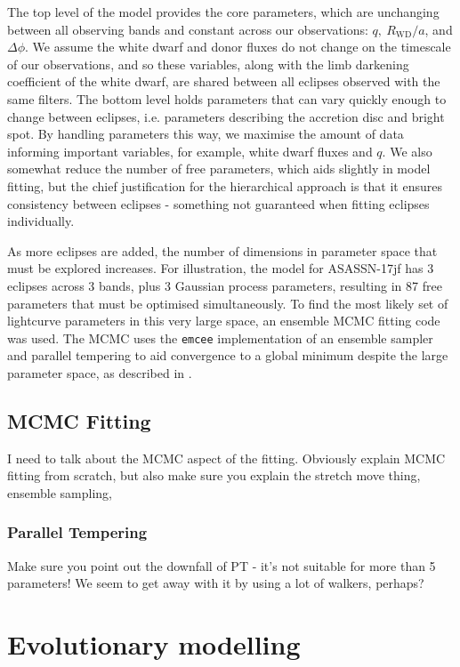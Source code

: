 The top level of the model provides the core parameters, which are unchanging between all observing bands and constant across our observations: $q,\ R_\mathrm{WD}/a$, and $\Delta\phi$. We assume the white dwarf and donor fluxes do not change on the timescale of our observations, and so these variables, along with the limb darkening coefficient of the white dwarf, are shared between all eclipses observed with the same filters. The bottom level holds parameters that can vary quickly enough to change between eclipses, i.e. parameters describing the accretion disc and bright spot. By handling parameters this way, we maximise the amount of data informing important variables, for example, white dwarf fluxes and $q$. We also somewhat reduce the number of free parameters, which aids slightly in model fitting, but the chief justification for the hierarchical approach is that it ensures consistency between eclipses - something not guaranteed when fitting eclipses individually.

As more eclipses are added, the number of dimensions in parameter space that must be explored increases. For illustration, the model for ASASSN-17jf has 3 eclipses across 3 bands, plus 3 Gaussian process parameters, resulting in 87 free parameters that must be optimised simultaneously. To find the most likely set of lightcurve parameters in this very large space, an ensemble MCMC fitting code was used. The MCMC uses the \texttt{emcee} implementation of an ensemble sampler and parallel tempering \citep{foreman2012} to aid convergence to a global minimum despite the large parameter space, as described in \citet{McAllister2019}.




\subsection{MCMC Fitting}
\label{sect:modelling:ensemble MCMC}

I need to talk about the MCMC aspect of the fitting. Obviously explain MCMC fitting from scratch, but also make sure you explain the stretch move thing, ensemble sampling,

\subsubsection{Parallel Tempering}
Make sure you point out the downfall of PT - it's not suitable for more than 5 parameters! We seem to get away with it by using a lot of walkers, perhaps?


\section{Evolutionary modelling}
\label{sect:method:evolutionary modelling}